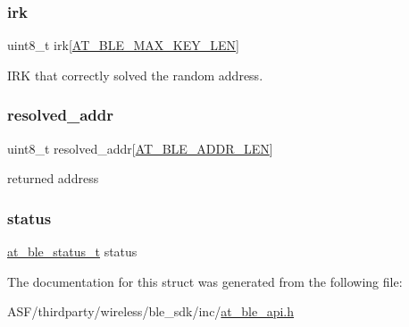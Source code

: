 \subsubsection{\texorpdfstring{irk}{irk}}
{\footnotesize\ttfamily uint8\+\_\+t irk\mbox{[}\mbox{\hyperlink{at__ble__api_8h_a462eb50567c44d7284308fe058158e99}{A\+T\+\_\+\+B\+L\+E\+\_\+\+M\+A\+X\+\_\+\+K\+E\+Y\+\_\+\+L\+EN}}\mbox{]}}



I\+RK that correctly solved the random address. 

\mbox{\label{structat__ble__resolv__rand__addr__status__t_afa616d7021acb4609f2b5ae9ba707b26}} 
\subsubsection{\texorpdfstring{resolved\_addr}{resolved\_addr}}
{\footnotesize\ttfamily uint8\+\_\+t resolved\+\_\+addr\mbox{[}\mbox{\hyperlink{at__ble__api_8h_a2452b42d01f07d3cd766fcab56d3ae62}{A\+T\+\_\+\+B\+L\+E\+\_\+\+A\+D\+D\+R\+\_\+\+L\+EN}}\mbox{]}}



returned address 

\mbox{\label{structat__ble__resolv__rand__addr__status__t_a0b48093fc2030779fc47e5216f8019e2}} 
\subsubsection{\texorpdfstring{status}{status}}
{\footnotesize\ttfamily \mbox{\hyperlink{group__error__codes__group_ga3b1db9b95feb157b3c188ca27fe76988}{at\+\_\+ble\+\_\+status\+\_\+t}} status}



The documentation for this struct was generated from the following file\+:\begin{DoxyCompactItemize}
\item 
A\+S\+F/thirdparty/wireless/ble\+\_\+sdk/inc/\mbox{\hyperlink{at__ble__api_8h}{at\+\_\+ble\+\_\+api.\+h}}\end{DoxyCompactItemize}
